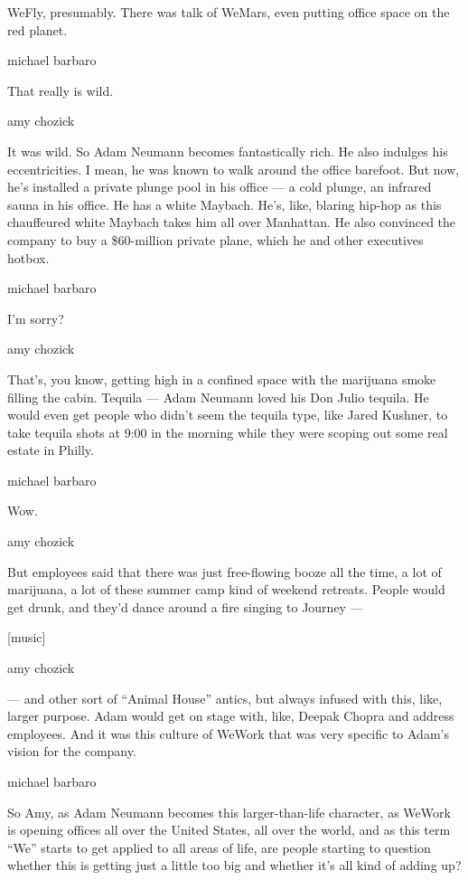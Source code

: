 WeFly, presumably. There was talk of WeMars, even putting office space
on the red planet.

michael barbaro

That really is wild.

amy chozick

It was wild. So Adam Neumann becomes fantastically rich. He also
indulges his eccentricities. I mean, he was known to walk around the
office barefoot. But now, he's installed a private plunge pool in his
office --- a cold plunge, an infrared sauna in his office. He has a
white Maybach. He's, like, blaring hip-hop as this chauffeured white
Maybach takes him all over Manhattan. He also convinced the company to
buy a \$60-million private plane, which he and other executives hotbox.

michael barbaro

I'm sorry?

amy chozick

That's, you know, getting high in a confined space with the marijuana
smoke filling the cabin. Tequila --- Adam Neumann loved his Don Julio
tequila. He would even get people who didn't seem the tequila type, like
Jared Kushner, to take tequila shots at 9:00 in the morning while they
were scoping out some real estate in Philly.

michael barbaro

Wow.

amy chozick

But employees said that there was just free-flowing booze all the time,
a lot of marijuana, a lot of these summer camp kind of weekend retreats.
People would get drunk, and they'd dance around a fire singing to
Journey ---

{[}music{]}

amy chozick

--- and other sort of ``Animal House'' antics, but always infused with
this, like, larger purpose. Adam would get on stage with, like, Deepak
Chopra and address employees. And it was this culture of WeWork that was
very specific to Adam's vision for the company.

michael barbaro

So Amy, as Adam Neumann becomes this larger-than-life character, as
WeWork is opening offices all over the United States, all over the
world, and as this term ``We'' starts to get applied to all areas of
life, are people starting to question whether this is getting just a
little too big and whether it's all kind of adding up?

